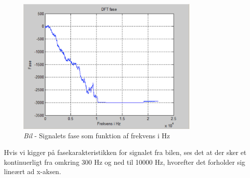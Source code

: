 \begin{figure}[H]
	\centering
	\includegraphics[width=0.8\textwidth]{Figurer/Bil4}
	\caption{\textit{Bil} - Signalets fase som funktion af frekvens i Hz}
\end{figure}

Hvis vi kigger på fasekarakteristikken for signalet fra bilen, ses det at der sker et kontinuerligt fra omkring 300 Hz og ned til 10000 Hz, hvorefter det forholder sig lineært ad x-aksen.









